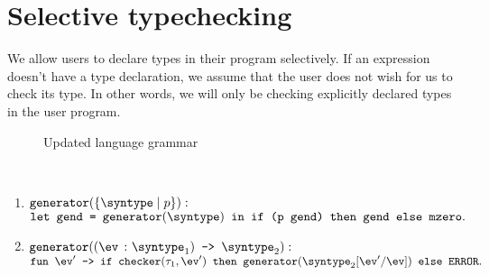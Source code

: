 \section{Selective typechecking}

We allow users to declare types in their program selectively. If an expression doesn't have a type declaration, we assume that the user does not wish for us to check its type. In other words, we will only be checking explicitly declared types in the user program.



\begin{figure}[hbt!]%
  \begin{grammar}
            \grule[types]{\syntype}{
              \cdots
              \gor \mktset{\syntype}{\expr}
              \gor \mkdfun{\ev}{\syntype}{\syntype}
            }
        \end{grammar}
    \caption{Updated language grammar}
    \label{fig_updatedGrammar}
\end{figure}

\begin{definition}
  \label{def_genExt}
  \ \par 
  \begin{enumerate}
    \item $\mkgen{\mktset{\syntype}{p}} : $ \\ 
    $\texttt{let gend = }\mkgen{\syntype} \texttt{ in } \ife{\texttt{(p gend)}}{\texttt{gend}}{\mzero}.$
    \item $\mkgen{\mkdfun{\ev}{\syntype_1}{\syntype_2}} : $
    \\$\mkfunv{\ev'}{\ife{\mkche{\tau_1}{\ev'}}{\mkgen{\substitute{\syntype_2}{\ev'}{\ev}}}{\eerror}}.$
  \end{enumerate}
\end{definition}

